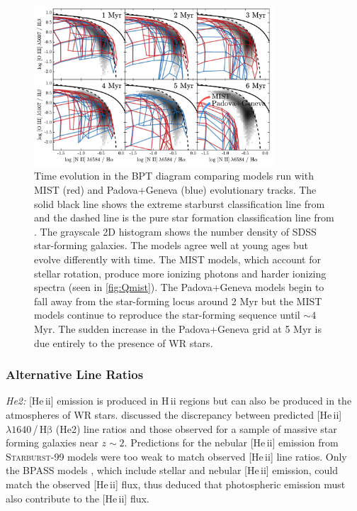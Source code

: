 \documentclass[trackchanges, twocolumn, tighten]{aastex61}
\newcommand{\Fig}[1]{\autoref{fig:#1}}
\newcommand{\SB}{\textsc{Starburst-99}\xspace}
\newcommand{\heii}{[He\,{\sc ii}]\xspace}
\newcommand{\hb}{\ensuremath{\mathrm{H\beta}}}
\newcommand{\hii}{H\,{\sc ii}\xspace}
\newcommand\lam[1]{\ensuremath{\lambda #1}}
\begin{document}
\begin{figure}
  \begin{centering}
    \includegraphics[width=0.8\textwidth]{f22.pdf}
    \caption{Time evolution in the BPT diagram comparing models run with MIST (red) and Padova+Geneva (blue) evolutionary tracks. The solid black line shows the extreme starburst classification line from \citet{Kewley01} and the dashed line is the pure star formation classification line from \citet{Kauffmann03a}. The  grayscale 2D histogram shows the number density of SDSS star-forming galaxies. The models agree well at young ages but evolve differently with time. The MIST models, which account for stellar rotation, produce more ionizing photons and harder ionizing spectra (seen in \Fig{Qmist}). The Padova+Geneva models begin to fall away from the star-forming locus around 2 Myr but the MIST models continue to reproduce the star-forming sequence until ${\sim}4$ Myr. The sudden increase in the Padova+Geneva grid at 5 Myr is due entirely to the presence of WR stars.}
    \label{fig:BPTmistAge}
  \end{centering}
\end{figure}

\subsubsection{Alternative Line Ratios}

{\it He2:} \heii emission is produced in \hii regions but can also be produced in the atmospheres of WR stars. \citet{Steidel16} discussed the discrepancy between predicted \heii\lam{1640}\,/\,\hb{} (He2) line ratios and those observed for a sample of massive star forming galaxies near $z\sim2$. Predictions for the nebular \heii{} emission from \SB{} models were too weak to match observed \heii{} line ratios. Only the BPASS models \citep{Eldridge12}, which include stellar and nebular \heii{} emission, could match the observed \heii{} flux, thus \citet{Steidel16} deduced that photospheric emission must also contribute to the \heii flux. 
\end{document}
